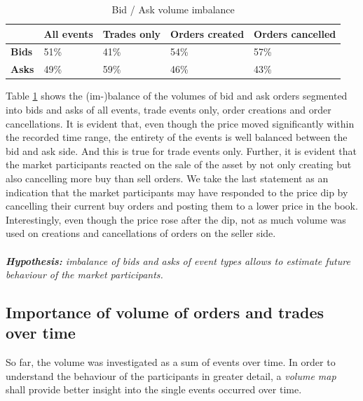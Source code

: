\begin{table}[H]
\centering
\begin{tabular}{l|l|l|l|l|}
\cline{2-5}
& \textbf{All events} & \textbf{Trades only} & \textbf{Orders created} & \textbf{Orders cancelled} \\ \hline
\multicolumn{1}{|l|}{\textbf{Bids}} & 51\%                & 41\%                 & 54\%                    & 57\%                      \\ \hline
\multicolumn{1}{|l|}{\textbf{Asks}} & 49\%                & 59\%                 & 46\%                    & 43\%                      \\ \hline
\end{tabular}
\caption{Bid / Ask volume imbalance}
\label{tbl:data-imbalance}
\end{table}

Table \ref{tbl:data-imbalance} shows the (im-)balance of the volumes of bid and ask orders segmented into bids and asks of all events, trade events only, order creations and order cancellations.
It is evident that, even though the price moved significantly within the recorded time range, the entirety of the events is well balanced between the bid and ask side.
And this is true for trade events only.
Further, it is evident that the market participants reacted on the sale of the asset by not only creating but also cancelling more buy than sell orders.
We take the last statement as an indication that the market participants may have responded to the price dip by cancelling their current buy orders and posting them to a lower price in the book.
Interestingly, even though the price rose after the dip, not as much volume was used on creations and cancellations of orders on the seller side.
\\
\\
\textit{\textbf{Hypothesis:} imbalance of bids and asks of event types allows to estimate future behaviour of the market participants.}

\subsection{Importance of volume of orders and trades over time}
\label{sec:data-hypthesis-order-trade-volume-time}

So far, the volume was investigated as a sum of events over time.
In order to understand the behaviour of the participants in greater detail, a \textit{volume map} shall provide better insight into the single events occurred over time.

